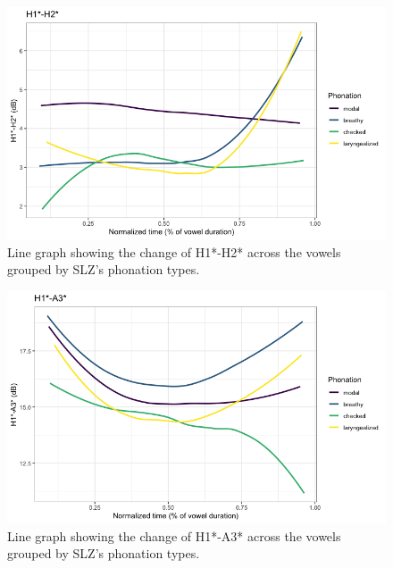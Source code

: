 \documentclass[12pt, letterpaper]{article}
\begin{document}
\begin{figure}[!h]
	\centering
	\includegraphics[width=.75\linewidth]{Images/h1h2.png}
	\caption{Line graph showing the change of H1*-H2* across the vowels grouped by SLZ's phonation types.}
	\label{fig:H1H2}
\end{figure}

\begin{figure}[!h]
	\centering
	\includegraphics[width=.75\linewidth]{Images/h1a3.png}
	\caption{Line graph showing the change of H1*-A3* across the vowels grouped by SLZ's phonation types.}
	\label{fig:H1A3}
\end{figure}
\end{document}
